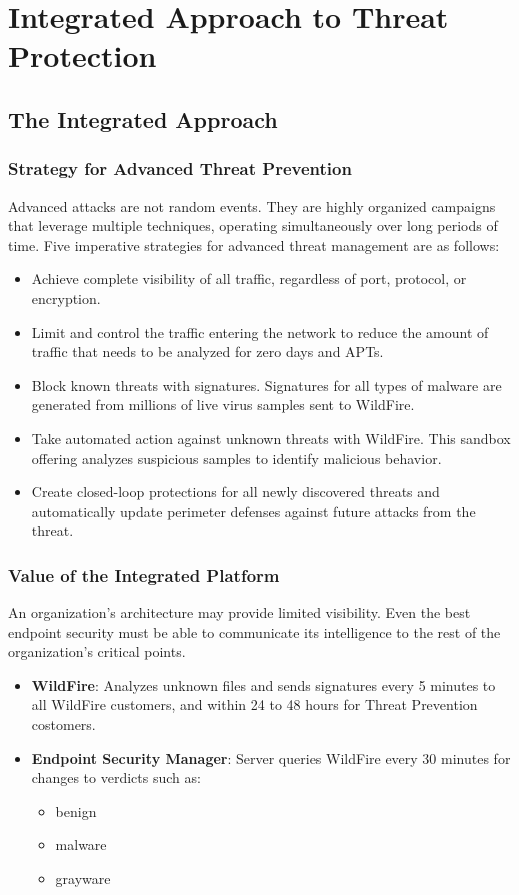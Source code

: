 \section{Integrated Approach to Threat Protection}
\subsection{The Integrated Approach}
\subsubsection{Strategy for Advanced Threat Prevention}
Advanced attacks are not random events. They are highly organized campaigns that leverage multiple techniques, operating simultaneously over long periods of time.
\newline
Five imperative strategies for advanced threat management are as follows:
\begin{itemize}
    \item Achieve complete visibility of all traffic, regardless of port, protocol, or encryption.
    \item Limit and control the traffic entering the network to reduce the amount of traffic that needs to be analyzed for zero days and APTs.
    \item Block known threats with signatures.
    Signatures for all types of malware are generated from millions of live virus samples sent to WildFire.
    \item Take automated action against unknown threats with WildFire. This sandbox offering analyzes suspicious samples to identify malicious behavior.
    \item Create closed-loop protections for all newly discovered threats and automatically update perimeter defenses against future attacks from the threat.
\end{itemize}

\subsubsection{Value of the Integrated Platform}
An organization's architecture may provide limited visibility. Even the best endpoint security must be able to communicate its intelligence to the rest of the organization's critical points.
\begin{itemize}
    \item \textbf{WildFire}: Analyzes unknown files and sends signatures every 5 minutes to all WildFire customers, and within 24 to 48 hours for Threat Prevention costomers.
    \item \textbf{Endpoint Security Manager}: Server queries WildFire every 30 minutes for changes to verdicts such as:
        \begin{itemize}
            \item benign
            \item malware
            \item grayware
        \end{itemize}
\end{itemize}

